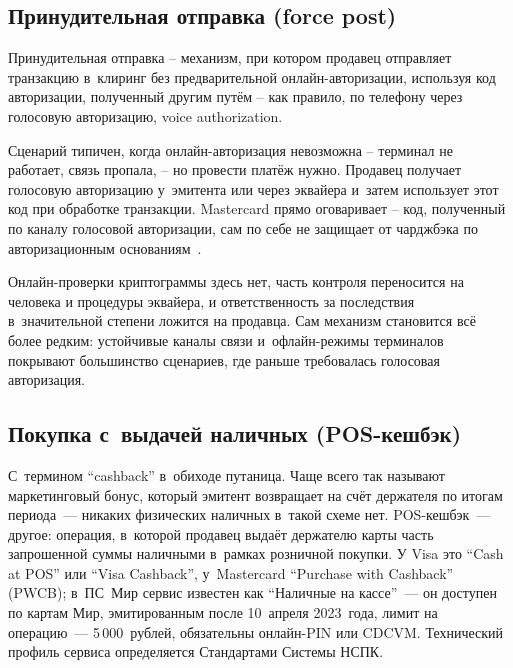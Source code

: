 \subsection*{Принудительная отправка (force post)}

Принудительная отправка -- механизм, при котором продавец отправляет
транзакцию в~клиринг без предварительной онлайн-авторизации, используя
код авторизации, полученный другим путём -- как правило, по телефону
через голосовую авторизацию, voice authorization.

Сценарий типичен, когда онлайн-авторизация невозможна -- терминал
не работает, связь пропала, -- но провести платёж нужно. Продавец
получает голосовую авторизацию у~эмитента или через эквайера
и~затем использует этот код при обработке транзакции. Mastercard
прямо оговаривает -- код, полученный по каналу голосовой авторизации,
сам по себе не защищает от чарджбэка по авторизационным
основаниям~\cite{mc-tpr}.

Онлайн-проверки криптограммы здесь нет, часть контроля переносится
на человека и процедуры эквайера, и ответственность за последствия
в~значительной степени ложится на продавца. Сам механизм становится всё более редким:
устойчивые каналы связи и~офлайн-режимы терминалов покрывают
большинство сценариев, где раньше требовалась голосовая авторизация.

\subsection*{Покупка с~выдачей наличных (POS-кешбэк)}\label{sec:tx-pos-cashback}

С~термином \enquote{cashback} в~обиходе путаница. Чаще всего так
называют маркетинговый бонус, который эмитент возвращает на счёт
держателя по итогам периода~--- никаких физических наличных в~такой
схеме нет. POS-кешбэк~--- другое: операция, в~которой продавец
выдаёт держателю карты часть запрошенной суммы наличными в~рамках
розничной покупки. У Visa это \enquote{Cash at POS} или
\enquote{Visa Cashback}, у~Mastercard \enquote{Purchase with Cashback}
(PWCB); в~ПС~Мир сервис известен как \enquote{Наличные на кассе}~---
он доступен по картам Мир, эмитированным после 10~апреля 2023~года,
лимит на операцию~--- 5\,000~рублей, обязательны онлайн-PIN или CDCVM.
Технический профиль сервиса определяется Стандартами Системы НСПК.

